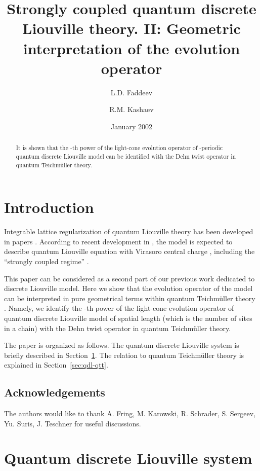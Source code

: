 \documentclass[a4paper,draft]{amsart}
\title[Strongly coupled quantum discrete Liouville theory]{Strongly
coupled quantum discrete Liouville theory. II:
Geometric interpretation of the evolution operator}
\author{L.D. Faddeev}
\author{R.M. Kashaev}
\date{January 2002}
\theoremstyle{definition}
\theoremstyle{remark}
\begin{document}
\begin{abstract}
  It is shown that the \coordHE{}-th power of the light-cone
  evolution operator of \coordHE{}-periodic quantum discrete Liouville model
can be identified with the 
Dehn twist operator in quantum Teichm\"uller theory. 
\end{abstract}
\maketitle


\section*{Introduction}

Integrable lattice regularization
of quantum Liouville theory has been developed in
papers \cite{fadtak,faddeev91,fadVol97}. According to recent development
in \cite{fkv}, the model is expected to describe quantum
Liouville equation with Virasoro central charge \coordHE{}, including
the ``strongly coupled regime'' \coordHE{}.
 
This paper can be considered as a second part of our previous work \cite{fkv} 
dedicated to discrete Liouville model. Here we show that the evolution
operator of the 
model can be interpreted in pure geometrical terms within
quantum Teichm\"uller theory
\cite{fock2,fock1,kash1,kash2,kash3}. 
Namely, we identify  the \coordHE{}-th power of the
light-cone evolution operator of quantum discrete Liouville model of
spatial length \coordHE{} (which is the number of sites in a chain) with the
Dehn twist operator in quantum Teichm\"uller theory. 
 
The paper is organized as follows.  The quantum discrete Liouville
system is briefly described in Section~\ref{sec:qdls}.  The
relation to quantum Teichm\"uller theory is explained in
Section~\ref{sec:qdl-qtt}. 
\subsection*{Acknowledgements}
The authors would like to thank A. Fring, M. Karowski,
   R. Schrader, S. Sergeev, Yu. Suris, J. Teschner
   for useful discussions.

\section{Quantum discrete Liouville system}
\label{sec:qdls}
\end{document}
